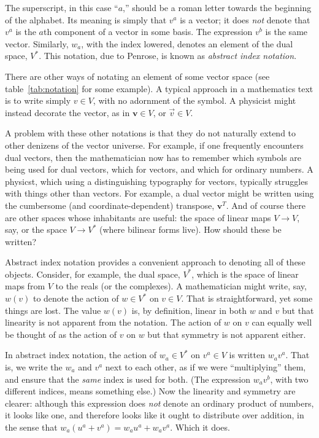 \documentclass[10pt, a4paper]{article}
\begin{document}
The superscript, in this case “$a$,” should be a roman letter towards
the beginning of the alphabet. Its meaning is simply that $v^a$ is a
vector; it does \emph{not} denote that $v^a$ is the $a$th component of a
vector in some basis. The expression $v^b$ is the same
vector. Similarly, $w_a$, with the index lowered, denotes an element
of the dual space, $V^*$. This notation, due to Penrose, is known as
\emph{abstract index notation}.

There are other ways of notating an element of some vector space (see
table~\ref{tab:notation} for some example). A typical approach in a
mathematics text is to write simply $v\in V$, with no adornment of the
symbol. A physicist might instead decorate the vector, as in
$\mathbold{v}\in V$, or $\vec{v}\in V$.

A problem with these other notations is that they do not naturally
extend to other denizens of the vector universe. For example, if one
frequently encounters dual vectors, then the mathematician now has to
remember which symbols are being used for dual vectors, which for
vectors, and which for ordinary numbers. A physicst, which using a
distinguishing typography for vectors, typically struggles with things
other than vectors. For example, a dual vector might be written using
the cumbersome (and coordinate-dependent) transpose,
$\mathbold{v}^T$.
And of course there are other spaces whose inhabitants are useful: the
space of linear maps $V\to V$, say, or the space $V\to V^*$ (where
bilinear forms live). How should these be written?

Abstract index notation provides a convenient approach to denoting all
of these objects. Consider, for example, the dual space, $V^*$, which
is the space of linear maps from $V$ to the reals (or the
complexes). A mathematician might write, say, $w(v)$ to denote the
action of $w\in V^*$ on $v\in V$. That is straightforward, yet some things
are lost. The value $w(v)$ is, by definition, linear in both $w$ and
$v$ but that linearity is not apparent from the notation. The action
of $w$ on $v$ can equally well be thought of as the action of $v$ on
$w$ but that symmetry is not apparent either.

In abstract index notation, the action of $w_a\in V^*$ on $v^a\in V$ is
written $w_av^a$. That is, we write the $w_a$ and $v^a$ next to each
other, as if we were “multiplying” them, and ensure that the
\emph{same} index is used for both. (The expression $w_av^b$, with two
different indices, means something else.) Now the linearity and
symmetry are clearer: although this expression does \emph{not} denote
an ordinary product of numbers, it looks like one, and therefore looks
like it ought to distribute over addition, in the sense that
$w_a(u^a+v^a) = w_au^a + w_av^a$. Which it does.
\end{document}
